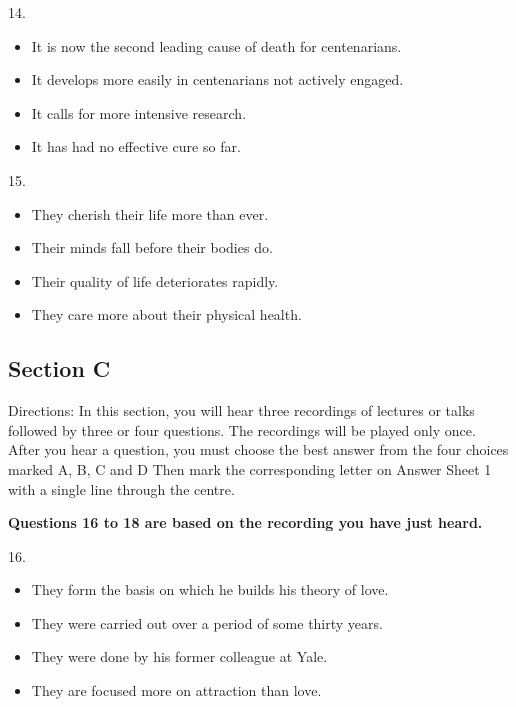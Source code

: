 \documentclass[UTF8,11pt]{ctexart}
\begin{document}
14.


\begin{itemize}[leftmargin=2em,itemsep=.2em,topsep=.4em]\item[A.] It is now the second leading cause of death for centenarians.
\item[B.] It develops more easily in centenarians not actively engaged.
\item[C.] It calls for more intensive research.
\item[D.] It has had no effective cure so far.
\end{itemize}

15.


\begin{itemize}[leftmargin=2em,itemsep=.2em,topsep=.4em]\item[A.] They cherish their life more than ever.
\item[B.] Their minds fall before their bodies do.
\item[C.] Their quality of life deteriorates rapidly.
\item[D.] They care more about their physical health.
\end{itemize}

\subsection*{Section C}


Directions: In this section, you will hear three recordings of lectures or talks followed by three or four questions. The recordings will be played only once. After you hear a question, you must choose the best answer from the four choices marked A, B, C and D Then mark the corresponding letter on Answer Sheet 1 with a single line through the centre.


\textbf{Questions 16 to 18 are based on the recording you have just heard.}


16.


\begin{itemize}[leftmargin=2em,itemsep=.2em,topsep=.4em]\item[A.] They form the basis on which he builds his theory of love.
\item[B.] They were carried out over a period of some thirty years.
\item[C.] They were done by his former colleague at Yale.
\item[D.] They are focused more on attraction than love.
\end{itemize}
\end{document}
